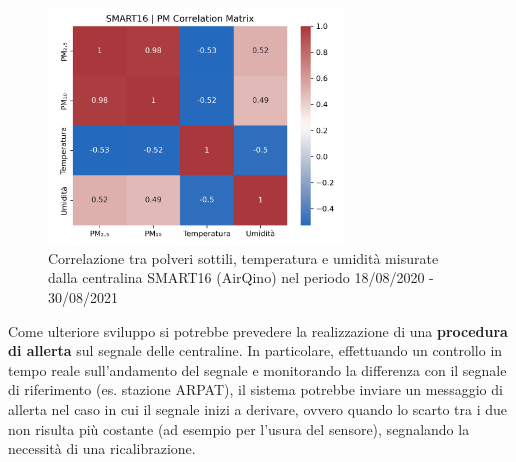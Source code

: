 \begin{figure}[H]
\centering
\captionsetup{justification=centering}
\includegraphics[width=0.70\textwidth,height=\textheight,keepaspectratio]{img/corr}
\caption{Correlazione tra polveri sottili, temperatura e umidità misurate dalla centralina SMART16 (AirQino) nel periodo 18/08/2020 - 30/08/2021}
\label{fig:corr}
\end{figure}

Come ulteriore sviluppo si potrebbe prevedere la realizzazione di una \textbf{procedura di allerta} sul segnale delle centraline. In particolare, effettuando un controllo in tempo reale sull'andamento del segnale e monitorando la differenza con il segnale di riferimento (es. stazione ARPAT), il sistema potrebbe inviare un messaggio di allerta nel caso in cui il segnale inizi a derivare, ovvero quando lo scarto tra i due non risulta più costante (ad esempio per l'usura del sensore), segnalando la necessità di una ricalibrazione.